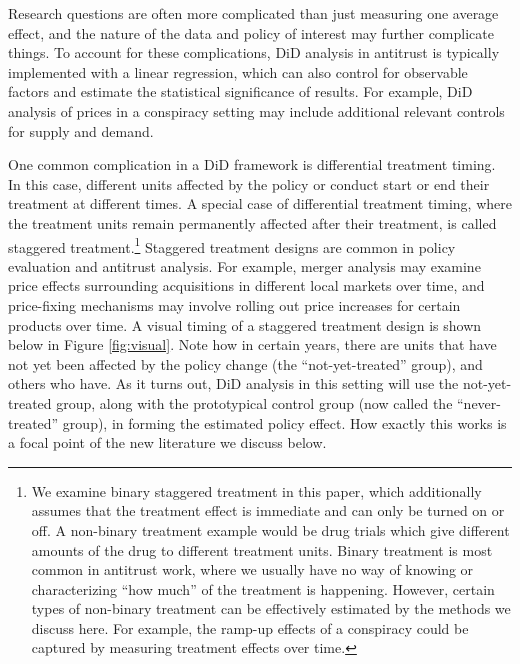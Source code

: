 \documentclass[12pt]{article}
\begin{document}
Research questions are often more complicated than just measuring one average effect, and the nature of the data and policy of interest may further complicate things. To account for these complications, DiD analysis in antitrust is typically implemented with a linear regression, which can also control for observable factors and estimate the statistical significance of results. For example, DiD analysis of prices in a conspiracy setting may include additional relevant controls for supply and demand.

One common complication in a DiD framework is differential treatment timing. In this case, different units affected by the policy or conduct start or end their treatment at different times. A special case of differential treatment timing, where the treatment units remain permanently affected after their treatment, is called staggered treatment.\footnote{We examine binary staggered treatment in this paper, which additionally assumes that the treatment effect is immediate and can only be turned on or off. A non-binary treatment example would be drug trials which give different amounts of the drug to different treatment units. Binary treatment is most common in antitrust work, where we usually have no way of knowing or characterizing “how much” of the treatment is happening. However, certain types of non-binary treatment can be effectively estimated by the methods we discuss here. For example, the ramp-up effects of a conspiracy could be captured by measuring treatment effects over time.}  Staggered treatment designs are common in policy evaluation and antitrust analysis. For example, merger analysis may examine price effects surrounding acquisitions in different local markets over time, and price-fixing mechanisms may involve rolling out price increases for certain products over time. A visual timing of a staggered treatment design is shown below in Figure \ref{fig:visual}. Note how in certain years, there are units that have not yet been affected by the policy change (the “not-yet-treated” group), and others who have. As it turns out, DiD analysis in this setting will use the not-yet-treated group, along with the prototypical control group (now called the “never-treated” group), in forming the estimated policy effect. How exactly this works is a focal point of the new literature we discuss below.
\end{document}
